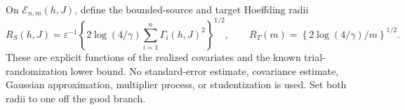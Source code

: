On \(\mathcal E_{n,m}(h,J)\), define the bounded-source and target Hoeffding radii
\[
R_S(h,J)=\varepsilon^{-1}\left\{2\log(4/\gamma)\sum_{i=1}^n\Gamma_i(h,J)^2\right\}^{1/2},
\qquad
R_T(m)=\left\{2\log(4/\gamma)/m\right\}^{1/2}.
\]
These are explicit functions of the realized covariates and the known trial-randomization lower bound.  No standard-error estimate, covariance estimate, Gaussian approximation, multiplier process, or studentization is used.  Set both radii to one off the good branch.